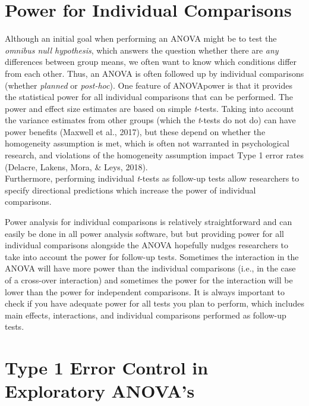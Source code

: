 \documentclass[,jou,floatsintext]{apa6}
\begin{document}
\hypertarget{power-for-individual-comparisons}{%
\section{Power for Individual Comparisons}\label{power-for-individual-comparisons}}

Although an initial goal when performing an ANOVA might be to test the \emph{omnibus null hypothesis}, which answers the question whether there are \emph{any} differences between group means, we often want to know which conditions differ from each other. Thus, an ANOVA is often followed up by individual comparisons (whether \emph{planned} or \emph{post-hoc}).
One feature of ANOVApower is that it provides the statistical power for all individual comparisons that can be performed.
The power and effect size estimates are based on simple \emph{t}-tests.
Taking into account the variance estimates from other groups (which the \emph{t}-tests do not do) can have power benefits (Maxwell et al., 2017), but these depend on whether the homogeneity assumption is met, which is often not warranted in psychological research, and violations of the homogeneity assumption impact Type 1 error rates (Delacre, Lakens, Mora, \& Leys, 2018).\\
Furthermore, performing individual \emph{t}-tests as follow-up tests allow researchers to specify directional predictions which increase the power of individual comparisons.

Power analysis for individual comparisons is relatively straightforward and can easily be done in all power analysis software, but but providing power for all individual comparisons alongside the ANOVA hopefully nudges researchers to take into account the power for follow-up tests.
Sometimes the interaction in the ANOVA will have more power than the individual comparisons (i.e., in the case of a cross-over interaction) and sometimes the power for the interaction will be lower than the power for independent comparisons.
It is always important to check if you have adequate power for all tests you plan to perform, which includes main effects, interactions, and individual comparisons performed as follow-up tests.

\hypertarget{type-1-error-control-in-exploratory-anovas}{%
\section{Type 1 Error Control in Exploratory ANOVA's}\label{type-1-error-control-in-exploratory-anovas}}
\end{document}
